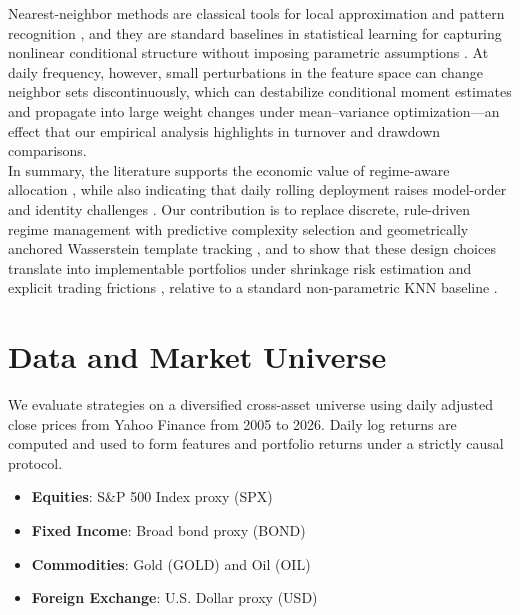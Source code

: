 \documentclass[11pt]{article}
\begin{document}
Nearest-neighbor methods are classical tools for local approximation and pattern recognition \cite{CoverHart1967}, and they are standard baselines in statistical learning for capturing nonlinear conditional structure without imposing parametric assumptions \cite{HastieTibshiraniFriedman2009}.
At daily frequency, however, small perturbations in the feature space can change neighbor sets discontinuously, which can destabilize conditional moment estimates and propagate into large weight changes under mean--variance optimization—an effect that our empirical analysis highlights in turnover and drawdown comparisons.\\
In summary, the literature supports the economic value of regime-aware allocation \cite{Hamilton1989,AngBekaert2002,AngBekaert2004,GuidolinTimmermann2007,GuidolinTimmermann2008}, while also indicating that daily rolling deployment raises model-order and identity challenges \cite{Stephens2000,Hirsa2024}.
Our contribution is to replace discrete, rule-driven regime management with predictive complexity selection and geometrically anchored Wasserstein template tracking \cite{Rabiner1989,CappeMoulinesRyden2005,Takatsu2011,PeyreCuturi2019,Villani2009}, and to show that these design choices translate into implementable portfolios under shrinkage risk estimation and explicit trading frictions \cite{LedoitWolf2004,LoboFazelBoyd2002,GarleanuPedersen2013}, relative to a standard non-parametric KNN baseline \cite{CoverHart1967,HastieTibshiraniFriedman2009}.

\section{Data and Market Universe}

We evaluate strategies on a diversified cross-asset universe using daily adjusted close prices from Yahoo Finance from 2005 to 2026.
Daily log returns are computed and used to form features and portfolio returns under a strictly causal protocol.

\begin{itemize}
    \item \textbf{Equities}: S\&P 500 Index proxy (SPX)
    \item \textbf{Fixed Income}: Broad bond proxy (BOND)
    \item \textbf{Commodities}: Gold (GOLD) and Oil (OIL)
    \item \textbf{Foreign Exchange}: U.S. Dollar proxy (USD)
\end{itemize}
\end{document}
